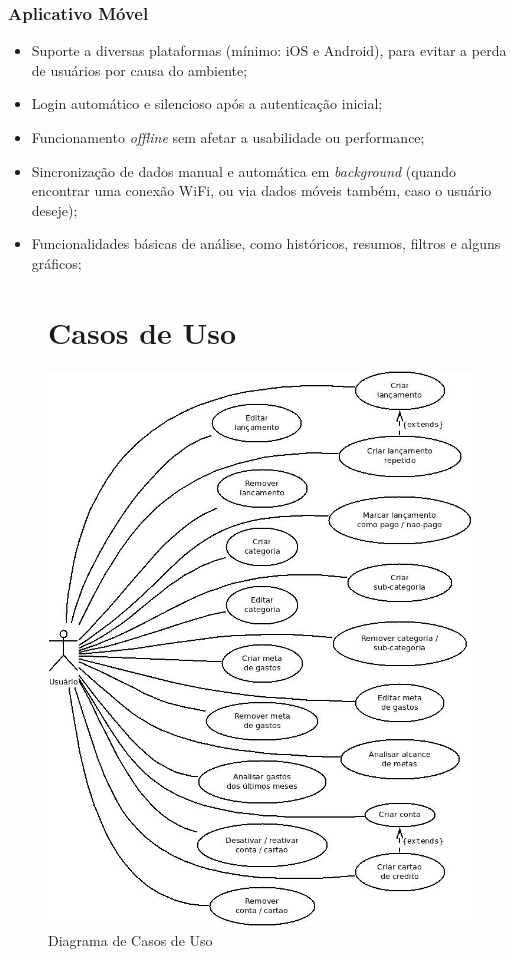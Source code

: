 \documentclass[a4paper]{abnt}
\begin{document}
\subsubsection{Aplicativo Móvel}
\begin{itemize}
	\item Suporte a diversas plataformas (mínimo: iOS e Android), para evitar a perda de usuários por causa do ambiente;
	\item Login automático e silencioso após a autenticaç\~ao inicial;
	\item Funcionamento \emph{offline} sem afetar a usabilidade ou performance;
	\item Sincronizaç\~ao de dados manual e automática em \emph{background} (quando encontrar uma conex\~ao WiFi, ou via dados móveis também, caso o usuário deseje);
	\item Funcionalidades básicas de análise, como históricos, resumos, filtros e alguns gráficos;
\end{itemize}
		


\begin{figure}
	\section{Casos de Uso}
	\centering
	\includegraphics[scale=0.6]{diagramas/casos-de-uso.jpg}
	\caption{Diagrama de Casos de Uso}
\end{figure}
\end{document}
